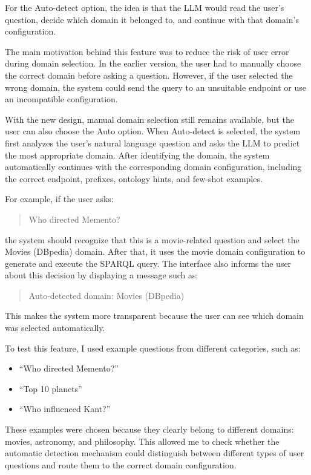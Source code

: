 \documentclass[11pt,a4paper]{article}
\begin{document}
For the Auto-detect option, the idea is that the LLM would read the user's question, decide which domain it belonged to, and continue with that domain's configuration.

The main motivation behind this feature was to reduce the risk of user error during domain selection. In the earlier version, the user had to manually choose the correct domain before asking a question. However, if the user selected the wrong domain, the system could send the query to an unsuitable endpoint or use an incompatible configuration.

With the new design, manual domain selection still remains available, but the user can also choose the Auto option. When Auto-detect is selected, the system first analyzes the user’s natural language question and asks the LLM to predict the most appropriate domain. After identifying the domain, the system automatically continues with the corresponding domain configuration, including the correct endpoint, prefixes, ontology hints, and few-shot examples.

For example, if the user asks:

\begin{quote}
Who directed Memento?
\end{quote}

the system should recognize that this is a movie-related question and select the Movies (DBpedia) domain. After that, it uses the movie domain configuration to generate and execute the SPARQL query. The interface also informs the user about this decision by displaying a message such as:

\begin{quote}
Auto-detected domain: Movies (DBpedia)
\end{quote}

This makes the system more transparent because the user can see which domain was selected automatically.

To test this feature, I used example questions from different categories, such as:

\begin{itemize}
    \item ``Who directed Memento?''
    \item ``Top 10 planets''
    \item ``Who influenced Kant?''
\end{itemize}

These examples were chosen because they clearly belong to different domains: movies, astronomy, and philosophy. This allowed me to check whether the automatic detection mechanism could distinguish between different types of user questions and route them to the correct domain configuration.
\end{document}
